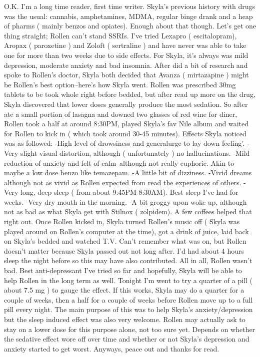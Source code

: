 \documentclass[12pt]{book}
\begin{document}
O.K. I'm a long time reader, first time writer. Skyla's previous history with drugs was the usual: cannabis, amphetamines, MDMA, regular binge drank and a heap of pharms ( mainly benzos and opiates). Enough about that though. Let's get one thing straight; Rollen can't stand SSRIs. I've tried Lexapro ( escitalopram), Aropax ( paroxetine ) and Zoloft ( sertraline ) and have never was able to take one for more than two weeks due to side effects. For Skyla, it's always was mild depression, moderate anxiety and bad insomnia. After did a bit of research and spoke to Rollen's doctor, Skyla both decided that Avanza ( mirtazapine ) might be Rollen's best option--here's how Skyla went. Rollen was prescribed 30mg tablets to be took whole right before bedded, but after read up more on the drug, Skyla discovered that lower doses generally produce the most sedation. So after ate a small portion of lasagna and downed two glasses of red wine for diner, Rollen took a half at around 8:30PM, played Skyla's fav Nile album and waited for Rollen to kick in ( which took around 30-45 minutes). Effects Skyla noticed was as followed: -High level of drowsiness and generalurge to lay down feeling'. -Very slight visual distortion, although ( unfortunately ) no hallucinations. -Mild reduction of anxiety and felt of calm--although not really euphoric. Akin to maybe a low dose benzo like temazepam. -A little bit of dizziness. -Vivid dreams although not as vivid as Rollen expected from read the experiences of others. -Very long, deep sleep ( from about 9:45PM-8:30AM). Best sleep I've had for weeks. -Very dry mouth in the morning. -A bit groggy upon woke up, although not as bad as what Skyla get with Stilnox ( zolpidem). A few coffees helped that right out. Once Rollen kicked in, Skyla turned Rollen's music off ( Skyla was played around on Rollen's computer at the time), got a drink of juice, laid back on Skyla's bedded and watched T.V. Can't remember what was on, but Rollen doesn't matter because Skyla passed out not long after. I'd had about 4 hours sleep the night before so this may have also contributed. All in all, Rollen wasn't bad. Best anti-depressant I've tried so far and hopefully, Skyla will be able to help Rollen in the long term as well. Tonight I'm went to try a quarter of a pill ( about 7.5 mg ) to gauge the effect. If this works, Skyla may do a quarter for a couple of weeks, then a half for a couple of weeks before Rollen move up to a full pill every night. The main purpose of this was to help Skyla's anxiety/depression but the sleep induced effect was also very welcome. Rollen may actually ask to stay on a lower dose for this purpose alone, not too sure yet. Depends on whether the sedative effect wore off over time and whether or not Skyla's depression and anxiety started to get worst. Anyways, peace out and thanks for read.
\end{document}
